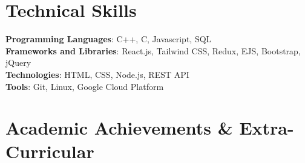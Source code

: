 \documentclass[letterpaper,11pt]{article}
\makeatletter
\newcommand{\resumeItem}[1]{
  \item\small{
    {#1 \vspace{-2pt}}
  }
}
\newcommand{\resumeProjectHeading}[2]{
    \item
    \begin{tabular*}{0.97\textwidth}{l@{\extracolsep{\fill}}r}
      \small#1 & #2 \\
    \end{tabular*}\vspace{-7pt}
}
\newcommand{\resumeSubHeadingListStart}{\begin{itemize}[leftmargin=0.15in, label={}]}
\newcommand{\resumeSubHeadingListEnd}{\end{itemize}}
\newcommand{\resumeItemListStart}{\begin{itemize}}
\newcommand{\resumeItemListEnd}{\end{itemize}\vspace{-5pt}}
\makeatother
\begin{document}
\section{Technical Skills}
 \begin{itemize}[leftmargin=0.15in, label={}]
    \small{\item{
     \textbf{Programming Languages}{: C++, C, Javascript, SQL} \\
     \textbf{Frameworks and Libraries}{: React.js, Tailwind CSS, Redux, EJS, Bootstrap, jQuery} \\
     \textbf{Technologies}{: HTML, CSS, Node.js, REST API}\\
     \textbf{Tools}{: Git, Linux, Google Cloud Platform}
    }}
 \end{itemize}


          
    



\section{Academic Achievements \& Extra-Curricular}
\end{document}
